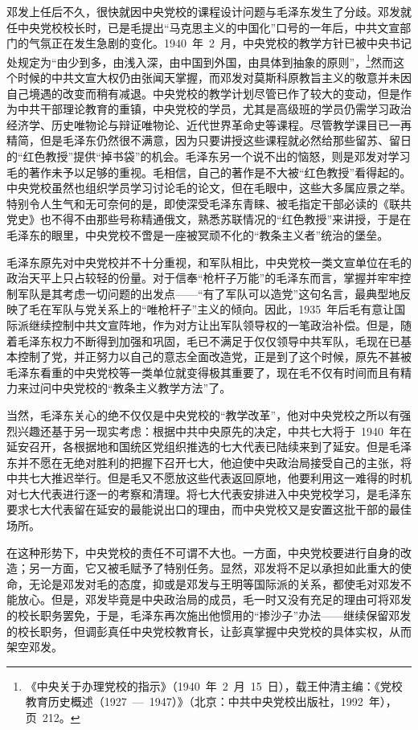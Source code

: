 邓发上任后不久，很快就因中央党校的课程设计问题与毛泽东发生了分歧。邓发就任中央党校校长时，已是毛提出“马克思主义的中国化”口号的一年后，中共文宣部门的气氛正在发生急剧的变化。1940~年~2~月，中央党校的教学方针已被中央书记处规定为“由少到多，由浅入深，由中国到外国，由具体到抽象的原则”，\footnote{《中央关于办理党校的指示》（1940~年~2~月~15~日），载王仲清主编：《党校教育历史概述（1927~—~1947）》（北京：中共中央党校出版社，1992~年），页~212。}然而这个时候的中共文宣大权仍由张闻天掌握，而邓发对莫斯科原教旨主义的敬意并未因自己境遇的改变而稍有减退。中央党校的教学计划尽管已作了较大的变动，但是作为中共干部理论教育的重镇，中央党校的学员，尤其是高级班的学员仍需学习政治经济学、历史唯物论与辩证唯物论、近代世界革命史等课程。尽管教学课目已一再精简，但是毛泽东仍然很不满意，因为只要讲授这些课程就必然给那些留苏、留日的“红色教授”提供“掉书袋”的机会。毛泽东另一个说不出的恼怒，则是邓发对学习毛的著作未予以足够的重视。毛相信，自己的著作是不大被“红色教授”看得起的。中央党校虽然也组织学员学习讨论毛的论文，但在毛眼中，这些大多属应景之举。特别令人生气和无可奈何的是，即使深受毛泽东青睐、被毛指定干部必读的《联共党史》也不得不由那些号称精通俄文，熟悉苏联情况的“红色教授”来讲授，于是在毛泽东的眼里，中央党校不啻是一座被冥顽不化的“教条主义者”统治的堡垒。

毛泽东原先对中央党校并不十分重视，和军队相比，中央党校一类文宣单位在毛的政治天平上只占较轻的份量。对于信奉“枪杆子万能”的毛泽东而言，掌握并牢牢控制军队是其考虑一切问题的出发点——“有了军队可以造党”这句名言，最典型地反映了毛在军队与党关系上的“唯枪杆子”主义的倾向。因此，1935~年后毛有意让国际派继续控制中共文宣阵地，作为对方让出军队领导权的一笔政治补偿。但是，随着毛泽东权力不断得到加强和巩固，毛已不满足于仅仅领导中共军队，毛现在已基本控制了党，并正努力以自己的意志全面改造党，正是到了这个时候，原先不甚被毛泽东看重的中央党校等一类单位就变得极其重要了，现在毛不仅有时间而且有精力来过问中央党校的“教条主义教学方法”了。

当然，毛泽东关心的绝不仅仅是中央党校的“教学改革”，他对中央党校之所以有强烈兴趣还基于另一现实考虑：根据中共中央原先的决定，中共七大将于~1940~年在延安召开，各根据地和国统区党组织推选的七大代表已陆续来到了延安。但是毛泽东并不愿在无绝对胜利的把握下召开七大，他迫使中央政治局接受自己的主张，将中共七大推迟举行。但是毛又不愿放这些代表返回原地，他要利用这一难得的时机对七大代表进行逐一的考察和清理。将七大代表安排进入中央党校学习，是毛泽东要求七大代表留在延安的最能说出口的理由，而中央党校又是安置这批干部的最佳场所。

在这种形势下，中央党校的责任不可谓不大也。一方面，中央党校要进行自身的改造；另一方面，它又被毛赋予了特别任务。显然，邓发将不足以承担如此重大的使命，无论是邓发对毛的态度，抑或是邓发与王明等国际派的关系，都使毛对邓发不能放心。但是，邓发毕竟是中央政治局的成员，毛一时又没有充足的理由可将邓发的校长职务罢免，于是，毛泽东再次施出他惯用的“掺沙子”办法——继续保留邓发的校长职务，但调彭真任中央党校教育长，让彭真掌握中央党校的具体实权，从而架空邓发。

